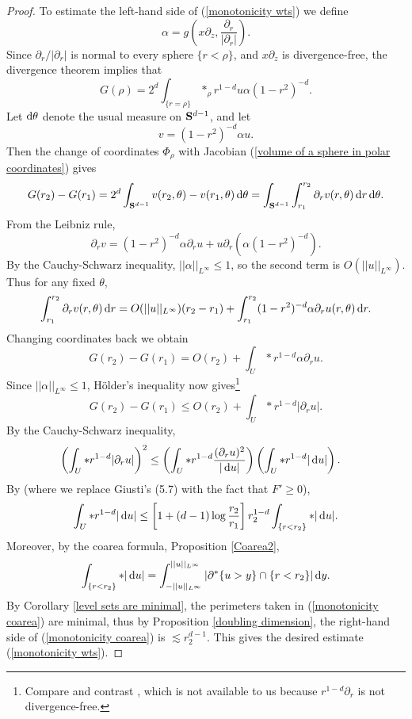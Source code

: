 \begin{proof}
To estimate the left-hand side of (\ref{monotonicity wts}) we define
$$\alpha = g\left(x \partial_z, \frac{\partial_r}{|\partial_r|}\right).$$
Since $\partial_r/|\partial_r|$ is normal to every sphere $\{r < \rho\}$, and $x\partial_z$ is divergence-free, the divergence theorem implies that 
$$G(\rho) = 2^d \int_{\{r = \rho\}} *_\rho r^{1 - d} u\alpha (1 - r^2)^{-d}.$$
Let $\mathop{}\!\mathrm{d} \theta$ denote the usual measure on $\mathbf S^{d - 1}$, and let
$$v = (1 - r^2)^{-d} \alpha u.$$
Then the change of coordinates $\Phi_\rho$ with Jacobian (\ref{volume of a sphere in polar coordinates}) gives
$$G(r_2) - G(r_1) = 2^d \int_{\mathbf S^{d - 1}} v(r_2, \theta) - v(r_1, \theta) \mathop{}\!\mathrm{d} \theta = \int_{\mathbf S^{d - 1}} \int_{r_1}^{r_2} \partial_r v(r, \theta) \mathop{}\!\mathrm{d} r \mathop{}\!\mathrm{d} \theta.$$
From the Leibniz rule,
$$\partial_r v = (1 - r^2)^{-d} \alpha \partial_r u + u\partial_r(\alpha(1 - r^2)^{-d}).$$
By the Cauchy-Schwarz inequality, $||\alpha||_{L^\infty} \leq 1$, so the second term is $O(||u||_{L^\infty})$. Thus for any fixed $\theta$,
$$\int_{r_1}^{r_2} \partial_r v(r, \theta) \mathop{}\!\mathrm{d} r = O(||u||_{L^\infty})(r_2 - r_1) + \int_{r_1}^{r_2} (1 - r^2)^{-d} \alpha \partial_r u(r, \theta) \mathop{}\!\mathrm{d} r.$$
Changing coordinates back we obtain 
$$G(r_2) - G(r_1) = O(r_2) + \int_U *r^{1 - d} \alpha \partial_r u.$$
Since $||\alpha||_{L^\infty} \leq 1$, H\"older's inequality now gives\footnote{Compare and contrast \cite[Lemma 5.3]{Giusti77}, which is not available to us because $r^{1 - d} \partial_r$ is not divergence-free.}
$$G(r_2) - G(r_1) \leq O(r_2) + \int_U *r^{1 - d} |\partial_r u|.$$
By the Cauchy-Schwarz inequality,
\begin{align*}
\left(\int_U *r^{1 - d} |\partial_r u| \right)^2 &\leq \left(\int_U *r^{1 - d}\frac{(\partial_ru)^2}{|\mathop{}\!\mathrm{d} u|}\right)\left(\int_U *r^{1 - d}|\mathop{}\!\mathrm{d} u|\right).
\end{align*}
By \cite[Lemma 5.11]{Giusti77} (where we replace Giusti's (5.7) with the fact that $F' \geq 0$),
$$\int_U *r^{1 - d}|\mathop{}\!\mathrm{d} u| \leq \left[1 + (d - 1) \log \frac{r_2}{r_1}\right] r_2^{1 - d} \int_{\{r < r_2\}} *|\mathop{}\!\mathrm{d} u|.$$
Moreover, by the coarea formula, Proposition \ref{Coarea2},
\begin{equation}\label{monotonicity coarea}
\int_{\{r < r_2\}} *|\mathop{}\!\mathrm{d} u| = \int_{-||u||_{L^\infty}}^{||u||_{L^\infty}} |\partial^* \{u > y\} \cap \{r < r_2\}| \mathop{}\!\mathrm{d} y.
\end{equation}
By Corollary \ref{level sets are minimal}, the perimeters taken in (\ref{monotonicity coarea}) are minimal, thus by Proposition \ref{doubling dimension}, the right-hand side of (\ref{monotonicity coarea}) is $\lesssim r_2^{d - 1}$.
This gives the desired estimate (\ref{monotonicity wts}).
\end{proof}


